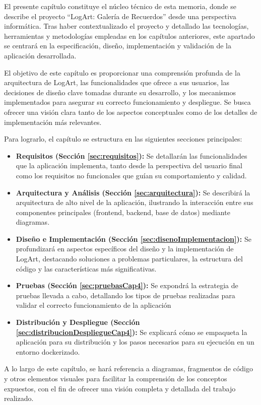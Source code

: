 El presente capítulo constituye el núcleo técnico de esta memoria, donde se describe el proyecto ``LogArt: Galería de Recuerdos'' desde una perspectiva informática. Tras haber contextualizado el proyecto y detallado las tecnologías, herramientas y metodologías empleadas en los capítulos anteriores, este apartado se centrará en la especificación, diseño, implementación y validación de la aplicación desarrollada.

El objetivo de este capítulo es proporcionar una comprensión profunda de la arquitectura de LogArt, las funcionalidades que ofrece a sus usuarios, las decisiones de diseño clave tomadas durante su desarrollo, y los mecanismos implementados para asegurar su correcto funcionamiento y despliegue. Se busca ofrecer una visión clara tanto de los aspectos conceptuales como de los detalles de implementación más relevantes.

Para lograrlo, el capítulo se estructura en las siguientes secciones principales:
\begin{itemize}
    \item \textbf{Requisitos (Sección \ref{sec:requisitos}):} Se detallarán las funcionalidades que la aplicación implementa, tanto desde la perspectiva del usuario final como los requisitos no funcionales que guían su comportamiento y calidad.
    \item \textbf{Arquitectura y Análisis (Sección \ref{sec:arquitectura}):} Se describirá la arquitectura de alto nivel de la aplicación, ilustrando la interacción entre sus componentes principales (frontend, backend, base de datos) mediante diagramas.
    \item \textbf{Diseño e Implementación (Sección \ref{sec:disenoImplementacion}):} Se profundizará en aspectos específicos del diseño y la implementación de LogArt, destacando soluciones a problemas particulares, la estructura del código y las características más significativas.
    \item \textbf{Pruebas (Sección \ref{sec:pruebasCap4}):} Se expondrá la estrategia de pruebas llevada a cabo, detallando los tipos de pruebas realizadas para validar el correcto funcionamiento de la aplicación
    \item \textbf{Distribución y Despliegue (Sección \ref{sec:distribucionDespliegueCap4}):} Se explicará cómo se empaqueta la aplicación para su distribución y los pasos necesarios para su ejecución en un entorno dockerizado.
\end{itemize}

A lo largo de este capítulo, se hará referencia a diagramas, fragmentos de código y otros elementos visuales para facilitar la comprensión de los conceptos expuestos, con el fin de ofrecer una visión completa y detallada del trabajo realizado.

